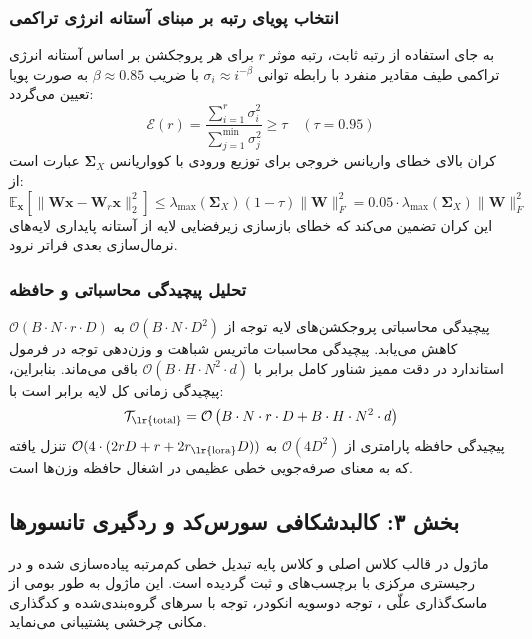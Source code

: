 \subsubsection*{انتخاب پویای رتبه بر مبنای آستانه انرژی تراکمی }
به جای استفاده از رتبه ثابت، رتبه موثر $r$ برای هر پروجکشن بر اساس آستانه انرژی تراکمی طیف مقادیر منفرد با رابطه توانی $\sigma_i \approx i^{-\beta}$ با ضریب $\beta \approx 0.85$ به صورت پویا تعیین می‌گردد:
\begin{equation}
\mathcal{E}(r) = \frac{\sum_{i=1}^r \sigma_i^2}{\sum_{j=1}^{\min} \sigma_j^2} \ge \tau \quad (\tau = 0.95)
\end{equation}
کران بالای خطای واریانس خروجی برای توزیع ورودی با کوواریانس $\mathbf{\Sigma}_X$ عبارت است از:
\begin{equation}
\mathbb{E}_{\mathbf{x}}\left[\|\mathbf{W}\mathbf{x} - \mathbf{W}_r \mathbf{x}\|_2^2\right] \le \lambda_{\max}(\mathbf{\Sigma}_X) (1 - \tau) \|\mathbf{W}\|_F^2 = 0.05 \cdot \lambda_{\max}(\mathbf{\Sigma}_X) \|\mathbf{W}\|_F^2
\end{equation}
این کران تضمین می‌کند که خطای بازسازی زیرفضایی لایه از آستانه پایداری لایه‌های نرمال‌سازی بعدی فراتر نرود.

\subsubsection*{تحلیل پیچیدگی محاسباتی و حافظه}
پیچیدگی محاسباتی پروجکشن‌های لایه توجه از $\mathcal{O}(B \cdot N \cdot D^2)$ به $\mathcal{O}(B \cdot N \cdot r \cdot D)$ کاهش می‌یابد. پیچیدگی محاسبات ماتریس شباهت و وزن‌دهی توجه در فرمول استاندارد در دقت ممیز شناور کامل برابر با $\mathcal{O}(B \cdot H \cdot N^2 \cdot d)$ باقی می‌ماند. بنابراین، پیچیدگی زمانی کل لایه برابر است با:
\begin{equation}
\mathcal{T}_{\text{\lr{total}}} = \mathcal{O}\left( B \cdot N \cdot r \cdot D + B \cdot H \cdot N^2 \cdot d \right)
\end{equation}
پیچیدگی حافظه پارامتری از $\mathcal{O}(4 D^2)$ به $\mathcal{O}(4 \cdot (2 r D + r + 2 r_{\text{\lr{lora}}} D))$ تنزل یافته که به معنای صرفه‌جویی خطی عظیمی در اشغال حافظه وزن‌ها است.

\subsection*{بخش ۳: کالبدشکافی سورس‌کد و ردگیری تانسورها }
ماژول  در قالب کلاس اصلی  و کلاس پایه تبدیل خطی کم‌مرتبه  پیاده‌سازی شده و در رجیستری مرکزی با برچسب‌های  و  ثبت گردیده است. این ماژول به طور بومی از ماسک‌گذاری علّی ، توجه دوسویه انکودر، توجه با سرهای گروه‌بندی‌شده  و کدگذاری مکانی چرخشی  پشتیبانی می‌نماید.

